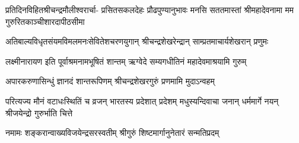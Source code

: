 \fourlineindentedshloka
{प्रतिदिनविहितश्रीचन्द्रमौलीश्वरार्चा-}
{प्रसितसकलदेहः प्रौढपुण्यानुभावः}
{मनसि सततमास्तां श्रीमहादेवनामा}
{मम गुरुरितकाञ्चीशारदापीठसीमा}%

\twolineshloka
{अतिबाल्यविधृतसंयमविमलमनःसेवितेशचरणयुगान्}
{श्रीचन्द्रशेखरेन्द्रान् साम्प्रतमाचार्यशेखरान् प्रणुमः}%

\twolineshloka
{लक्ष्मीनारायण इति पूर्वाश्रमनामभूषितं शान्तम्}
{ऋग्वेदे सम्यगधीतिनं महादेवमाश्रयामि गुरुम्}%

\twolineshloka
{अपारकरुणासिन्धुं ज्ञानदं शान्तरूपिणम्}
{श्रीचन्द्रशेखरगुरुं प्रणमामि मुदाऽन्वहम्}%

\fourlineindentedshloka
{परित्यज्य मौनं वटाधःस्थितिं च}
{व्रजन् भारतस्य प्रदेशात् प्रदेशम्}%
{मधुस्यन्दिवाचा जनान् धर्ममार्गे}
{नयन् श्रीजयेन्द्रो गुरुर्भाति चित्ते}%

\twolineshloka
{नमामः शङ्करान्वाख्यविजयेन्द्रसरस्वतीम्}
{श्रीगुरुं शिष्टमार्गानुनेतारं सन्मतिप्रदम्}%

\closesub
